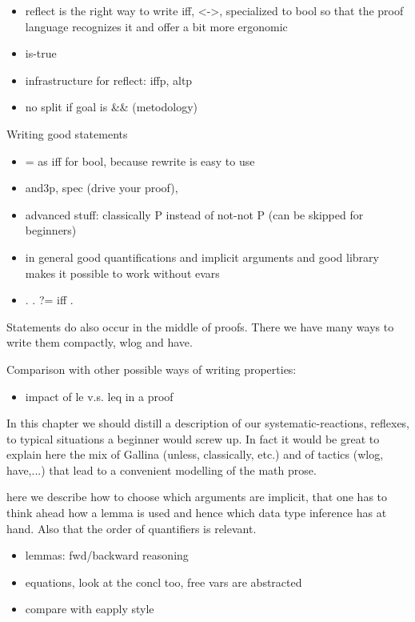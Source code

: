 \begin{itemize}
\item reflect is the right way to write iff, <->, specialized to bool
	so that the proof language recognizes it and offer a bit more ergonomic
\item is-true
\item infrastructure for reflect: iffp, altp
\item no split if goal is \&\& (metodology)
\end{itemize}

Writing good statements

\begin{itemize}
\item = as iff for bool, because rewrite is easy to use
\item and3p, spec (drive your proof),
\item advanced stuff: classically P instead of not-not P (can be
  skipped for beginners)
\item in general good quantifications and implicit arguments and good library
	makes it possible to work without evars
\item . \C{<=} . ?= iff .
\end{itemize}

Statements do also occur in the middle of proofs.  There we have many ways to
write them compactly, wlog and have.

Comparison with other possible ways of writing properties:
\begin{itemize}
\item impact of le v.s. leq in a proof
\end{itemize}

In this chapter we should distill a description of our
systematic-reactions, reflexes, to typical situations a
beginner would screw up. In fact it would be great to explain here the
mix of Gallina (unless, classically, etc.) and of tactics (wlog,
have,...) that lead to a convenient modelling of the math prose.
\label{sec:declaringimpl}

here we describe how to choose which arguments are implicit,
that one has to think ahead how  a lemma is used and hence
which data type inference has at hand.  Also that the order
of quantifiers is relevant.
\begin{itemize}
\item lemmas: fwd/backward reasoning
\item equations, look at the concl too, free vars are abstracted
\item compare with eapply style
\end{itemize}

